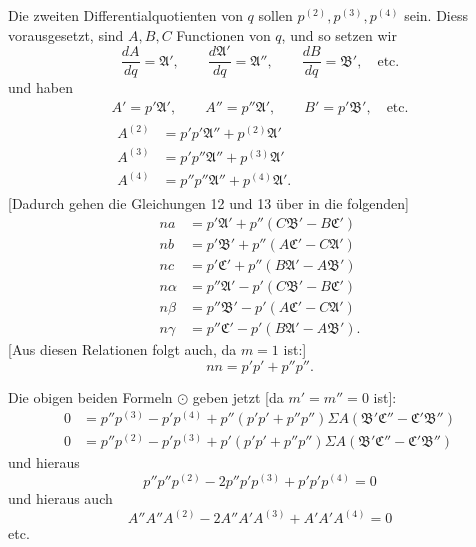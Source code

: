 \par{}%
Die zweiten Differentialquotienten von $q$ sollen $p^{(2)},p^{(3)},p^{(4)}$ sein. Diess vorausgesetzt, sind $A,B,C$ Functionen von $q$, und so setzen wir
\[
\frac{dA}{dq}=\mathfrak{A}',\qquad\frac{d\mathfrak{A}'}{dq}=\mathfrak{A}'',\qquad\frac{dB}{dq}=\mathfrak{B}',\quad\text{etc.}
\]
und haben
\[
\begin{gathered}
A'=p'\mathfrak{A}',\qquad A''=p''\mathfrak{A}',\qquad B'=p'\mathfrak{B}',\quad\text{etc.}\\
\begin{aligned}
A^{(2)}&=p'p'\mathfrak{A}''+p^{(2)}\mathfrak{A}'\\
A^{(3)}&=p'p''\mathfrak{A}''+p^{(3)}\mathfrak{A}'\\
A^{(4)}&=p''p''\mathfrak{A}''+p^{(4)}\mathfrak{A}'.
\end{aligned}
\end{gathered}
\]
[Dadurch gehen die Gleichungen 12 und 13 über in die folgenden]
\[
\begin{aligned}
na&=p'\mathfrak{A}'+p''(C\mathfrak{B}'-B\mathfrak{C}')\\
nb&=p'\mathfrak{B}'+p''(A\mathfrak{C}'-C\mathfrak{A}')\\
nc&=p'\mathfrak{C}'+p''(B\mathfrak{A}'-A\mathfrak{B}')\\[4pt]
n\alpha&=p''\mathfrak{A}'-p'(C\mathfrak{B}'-B\mathfrak{C}')\\
n\beta&=p''\mathfrak{B}'-p'(A\mathfrak{C}'-C\mathfrak{A}')\\
n\gamma&=p''\mathfrak{C}'-p'(B\mathfrak{A}'-A\mathfrak{B}').
\end{aligned}
\]
[Aus diesen Relationen folgt auch, da $m=1$ ist:]
\[
nn=p'p'+p''p''.
\]
\par\indent Die obigen beiden Formeln $\odot$ geben jetzt [da $m'=m''=0$ ist]:
\[
\begin{aligned}
0&=p''p^{(3)}-p'p^{(4)}+p''(p'p'+p''p'')\Sigma A(\mathfrak{B}'\mathfrak{C}''-\mathfrak{C}'\mathfrak{B}'')\\
0&=p''p^{(2)}-p'p^{(3)}+p'(p'p'+p''p'')\Sigma A(\mathfrak{B}'\mathfrak{C}''-\mathfrak{C}'\mathfrak{B}'')
\end{aligned}
\]
und hieraus
\[
p''p''p^{(2)}-2p''p'p^{(3)}+p'p'p^{(4)}=0
\]
und hieraus auch
\[
A''A''A^{(2)}-2A''A'A^{(3)}+A'A'A^{(4)}=0
\]
etc.
